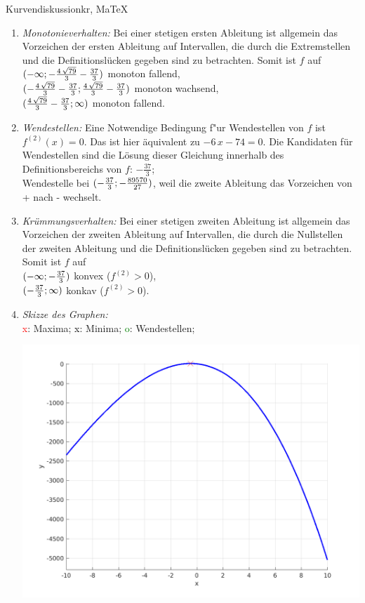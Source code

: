 \begin{MAufgabe}{Kurvendiskussion}{kr, MaTeX}
\begin{enumerate}
 \item \emph{Monotonieverhalten:} 
 Bei einer stetigen ersten Ableitung ist allgemein das Vorzeichen der ersten Ableitung auf Intervallen, die durch die Extremstellen und die Definitionsl\"ucken gegeben sind zu betrachten. Somit ist $f$ auf \\ 
 $(-\infty; - \frac{4\, \sqrt{79}}{3} - \frac{37}{3})$ monoton fallend, \\ 
 $( - \frac{4\, \sqrt{79}}{3} - \frac{37}{3};\frac{4\, \sqrt{79}}{3} - \frac{37}{3})$ monoton  wachsend, \\ 
 $(\frac{4\, \sqrt{79}}{3} - \frac{37}{3}; \infty)$ monoton fallend. \\ 
 \item \emph{Wendestellen:} 
 Eine Notwendige Bedingung f"ur Wendestellen von $f$ ist $f^{(2)}(x)=0$. 
 Das ist hier \"aquivalent zu $ - 6\, x - 74=0$. 
 Die Kandidaten f\"ur Wendestellen sind die L\"osung dieser Gleichung innerhalb des Definitionsbereichs von $f$: $- \frac{37}{3}$; \\ 
 Wendestelle bei $(- \frac{37}{3};- \frac{89570}{27})$, weil die zweite Ableitung das Vorzeichen von + nach - wechselt. \\ 
 \item \emph{Kr\"ummungsverhalten:} 
 Bei einer stetigen zweiten Ableitung ist allgemein das Vorzeichen der zweiten Ableitung auf Intervallen, die durch die Nullstellen der zweiten Ableitung und die Definitionsl\"ucken gegeben sind zu betrachten. 
 Somit ist $f$ auf \\ 
 $(-\infty ;- \frac{37}{3})$  konvex ($f^{(2)}>0$), \\ 
 $(- \frac{37}{3}; \infty)$  konkav ($f^{(2)}>0$). \\ 
 \item \emph{Skizze des Graphen:} \\ 
 {\textcolor{red} x}: Maxima; {\textcolor{black} x}: Minima; {\textcolor{green} o}: Wendestellen; 
  \begin{center}
  \includegraphics[width=0.8\linewidth]{Abb_zur_Ag_autogenerated_fractions_14.png} \end{center}
  
 \end{enumerate}
 \else\relax\fi
  \end{MAufgabe}